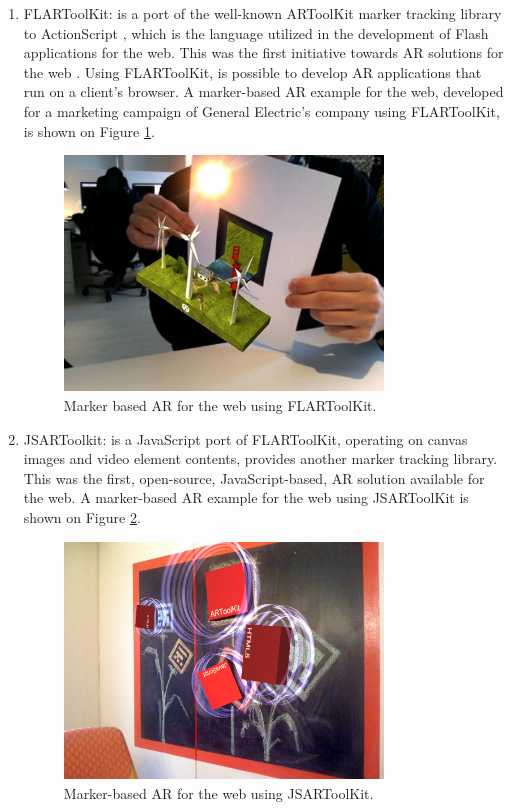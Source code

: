 \begin{enumerate}
    \item FLARToolKit: is a port of the well-known ARToolKit marker tracking library to ActionScript \cite{Flash2013}, which is the language utilized in the development of Flash applications for the web. This was the first initiative towards AR solutions for the web \cite{Pablo2013}. Using FLARToolKit, is possible to develop AR applications that run on a client's browser. A marker-based AR example for the web, developed for a marketing campaign of General Electric's company using FLARToolKit, is shown on Figure \ref{figure:flartoolkit}.

    \begin{figure}[!htb]
      \centering
      \includegraphics[width=240pt]{chapters/tracking_library_for_the_web/flartoolkit.png}
      \caption{Marker based AR for the web using FLARToolKit.}
      \label{figure:flartoolkit}
    \end{figure}

    \item JSARToolkit: is a JavaScript port of FLARToolKit, operating on canvas images and video element contents, provides another marker tracking library. This was the first, open-source, JavaScript-based, AR solution available for the web. A marker-based AR example for the web using JSARToolKit is shown on Figure \ref{figure:jsartoolkit}.

    \begin{figure}[!htb]
      \centering
      \includegraphics[width=240pt]{chapters/tracking_library_for_the_web/jsartoolkit.png}
      \caption{Marker-based AR for the web using JSARToolKit.}
      \label{figure:jsartoolkit}
    \end{figure}


\end{enumerate}
